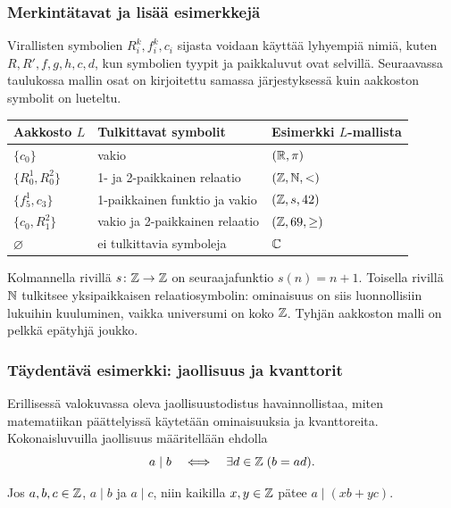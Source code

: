 \documentclass[11pt,a4paper]{amsart}
\begin{document}
\subsubsection{Merkintätavat ja lisää esimerkkejä}

Virallisten symbolien $R_i^k,f_i^k,c_i$ sijasta voidaan käyttää
lyhyempiä nimiä, kuten $R,R',f,g,h,c,d$, kun symbolien tyypit ja
paikkaluvut ovat selvillä. Seuraavassa taulukossa mallin osat on
kirjoitettu samassa järjestyksessä kuin aakkoston symbolit on lueteltu.

\begin{center}
  \renewcommand{\arraystretch}{1.35}
  \begin{tabular}{lll}
    \hline
    Aakkosto $L$ & Tulkittavat symbolit & Esimerkki $L$-mallista\\
    \hline
    $\{c_0\}$ & vakio & $(\mathbb{R},\pi)$\\
    $\{R_0^1,R_0^2\}$ & 1- ja 2-paikkainen relaatio & $(\mathbb{Z},\mathbb{N},<)$\\
    $\{f_5^1,c_3\}$ & 1-paikkainen funktio ja vakio & $(\mathbb{Z},s,42)$\\
    $\{c_0,R_1^2\}$ & vakio ja 2-paikkainen relaatio & $(\mathbb{Z},69,\geq)$\\
    $\varnothing$ & ei tulkittavia symboleja & $\mathbb{C}$\\
    \hline
  \end{tabular}
\end{center}

Kolmannella rivillä $s\colon\mathbb{Z}\to\mathbb{Z}$ on seuraajafunktio $s(n)=n+1$.
Toisella rivillä $\mathbb{N}$ tulkitsee yksipaikkaisen relaatiosymbolin:
ominaisuus on siis luonnollisiin lukuihin kuuluminen, vaikka universumi
on koko $\mathbb{Z}$. Tyhjän aakkoston malli on pelkkä epätyhjä joukko.

\subsubsection{Täydentävä esimerkki: jaollisuus ja kvanttorit}

Erillisessä valokuvassa oleva jaollisuustodistus havainnollistaa,
miten matematiikan päättelyissä käytetään ominaisuuksia ja kvanttoreita.
Kokonaisluvuilla jaollisuus määritellään ehdolla
\[
  a\mid b\quad\Longleftrightarrow\quad
  \exists d\in\mathbb{Z}\;(b=ad).
\]

\begin{proposition}
  Jos $a,b,c\in\mathbb{Z}$, $a\mid b$ ja $a\mid c$, niin kaikilla
  $x,y\in\mathbb{Z}$ pätee $a\mid(xb+yc)$.
\end{proposition}
\end{document}
